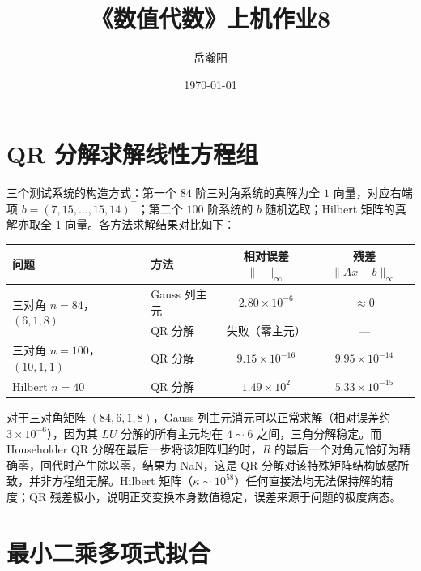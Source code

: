 \documentclass[10pt, a4paper]{article}
\title{\textbf{《数值代数》上机作业8}}
\author{岳瀚阳\quad\quad\quad\quad 3230104443}
\date{\today}
\begin{document}
\maketitle

\section{QR 分解求解线性方程组}

三个测试系统的构造方式：第一个 $84$ 阶三对角系统的真解为全 $1$ 向量，对应右端项 $b=(7,15,\ldots,15,14)^\top$；第二个 $100$ 阶系统的 $b$ 随机选取；Hilbert 矩阵的真解亦取全 $1$ 向量。各方法求解结果对比如下：

\begin{table}[H]
    \centering
    \begin{tabular}{llcc}
        \toprule
        问题 & 方法 & 相对误差 $\|\cdot\|_\infty$ & 残差 $\|Ax-b\|_\infty$ \\
        \midrule
        \multirow{2}{*}{三对角 $n=84$，$(6,1,8)$}
            & Gauss 列主元 & $2.80\times10^{-6}$ & $\approx 0$ \\
            & QR 分解      & 失败（零主元）       & --- \\
        \midrule
        三对角 $n=100$，$(10,1,1)$ & QR 分解 & $9.15\times10^{-16}$ & $9.95\times10^{-14}$ \\
        \midrule
        Hilbert $n=40$ & QR 分解 & $1.49\times10^{2}$ & $5.33\times10^{-15}$ \\
        \bottomrule
    \end{tabular}
\end{table}

对于三对角矩阵 $(84, 6, 1, 8)$，Gauss 列主元消元可以正常求解（相对误差约 $3\times10^{-6}$），因为其 $LU$ 分解的所有主元均在 $4\sim6$ 之间，三角分解稳定。而 Householder QR 分解在最后一步将该矩阵归约时，$R$ 的最后一个对角元恰好为精确零，回代时产生除以零，结果为 NaN，这是 QR 分解对该特殊矩阵结构敏感所致，并非方程组无解。Hilbert 矩阵（$\kappa\sim10^{58}$）任何直接法均无法保持解的精度；QR 残差极小，说明正交变换本身数值稳定，误差来源于问题的极度病态。

\section{最小二乘多项式拟合}
\end{document}
